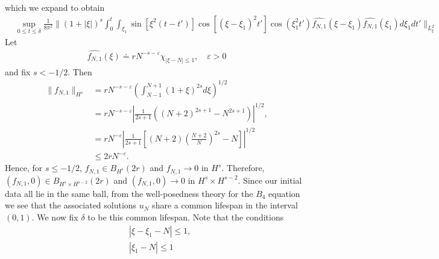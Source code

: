 \documentclass[12pt,reqno]{amsart}
\numberwithin{equation}{section}  %
\newcommand{\wh}{\widehat}
\newcommand{\ee}{\varepsilon}
\begin{document}
%
%
which we expand to obtain 
%
%
\begin{equation}
  \label{realyut}
\begin{split}
& \sup_{0 \le t \le \delta} \frac{1}{8 \pi^{2}}\| (1 + | \xi |)^{s}
\int_{0}^{t} \int_{\xi_{1}} \sin[\xi^{2}(t-t')] \cos[(\xi - \xi_{1})^{2}t']
\cos(\xi_{1}^{2}t') \wh{f_{N,1}}(\xi - \xi_{1})\wh{f_{N,1}}(\xi_{1}) d
\xi_{1}  dt'
\|_{L^{2}_{\xi}}
\end{split}
\end{equation}
%
%
%
%
%
%
%
%
%
Let
%
%
\begin{equation}
  \label{realill-pos-ce}
\begin{split}
  \wh{f_{N,1}}(\xi) \doteq r N^{-s - \ee} \chi_{|\xi - N|\le 1}, \quad \ee > 0
\end{split}
\end{equation}
%
and fix $s < -1/2$. Then
%
%
\begin{equation*}
\begin{split}
  \| f_{N,1} \|_{H^{s}}
  & = rN^{-s-\ee} \left( \int_{N-1}^{N+1} (1 + \xi)^{2s} d \xi
  \right)^{1/2}
  \\
  & = rN^{-s-\ee} \left| \frac{1}{2s+1}( (N+2)^{2s+1} - N^{2s+1} ) \right|^{1/2},
  \\
  & = r N^{-\ee} \left| {\frac{1}{2s+1}}\left [ (N+2) \left( \frac{N+2}{N}
  \right)^{2s} -N \right ] \right|^{1/2}  \\
  & \le 2 r N^{-\ee}.
\end{split}
\end{equation*}
%
Hence, for $s \le -1/2$, $f_{N,1} \in B_{H^{s}}(2r)$
and $f_{N,1} \to 0$ in $H^{s}$. Therefore,
$(f_{N,1}, 0) \in B_{H^{s} \times H^{s-2}}(2r)$ and $(f_{N,1}, 0) \to 0$ in
$H^{s} \times H^{s-2}$. Since our initial data all lie in the same ball, from
the well-posedness theory for the $B_{4}$ equation we see that
the associated solutions $u_{N}$ share a common lifespan in the interval
$(0, 1)$. We now fix $\delta$ to be this common lifespan. Note that the
conditions
%
%
\begin{equation*}
\begin{split}
  & | \xi - \xi_{1} - N | \le 1,
  \\
  & | \xi_{1} - N | \le 1
\end{split}
\end{equation*}
\end{document}
